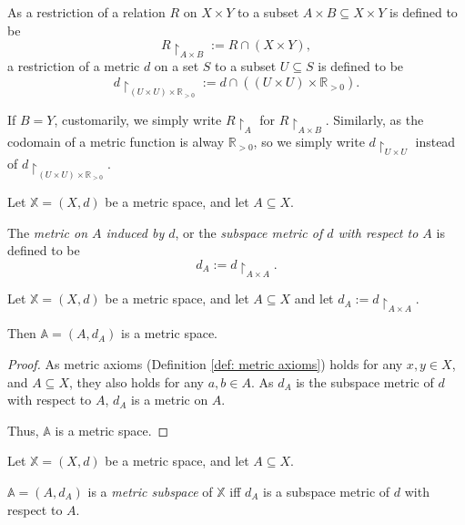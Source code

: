 As a restriction of a relation $R$ on $X \times Y$ to a subset $A \times B \subseteq X \times Y$ is defined to be
$$
R \restriction_{A \times B} := R \cap (X \times Y),
$$
a restriction of a metric $d$ on a set $S$ to a subset $U \subseteq S$ is defined to be
$$
d \restriction_{(U \times U) \times \mathbb R_{> 0}} := d \cap ((U \times U) \times \mathbb R_{> 0}).
$$

If $B = Y$, customarily, we simply write $R \restriction_{A}$ for $R \restriction_{A \times B}$. Similarly, as the codomain of a metric function is alway $\mathbb R_{> 0}$, so we simply write $d \restriction_{U \times U}$ instead of $d \restriction_{(U \times U) \times \mathbb R_{> 0}}$.


\begin{definition}
	\label{def: subspace metric}
	Let $\mathbb X = (X, d)$ be a metric space, and let $A \subseteq X$.
	
	The \textit{metric on $A$ induced by $d$}, or the \textit{subspace metric of $d$ with respect to $A$} is defined to be
	$$
	d_A := d\restriction_{A \times A}.
	$$
\end{definition}


\begin{theorem}
	Let $\mathbb X = (X, d)$ be a metric space, and let $A \subseteq X$ and let $d_A := d\restriction_{A \times A}$.
	
	Then $\mathbb A = (A, d_A)$ is a metric space.
	
	\begin{proof}		
		As metric axioms (Definition \ref{def: metric axioms}) holds for any $x,y \in X$, and $A \subseteq X$, they also holds for any $a, b \in A$. As $d_A$ is the subspace metric of $d$ with respect to $A$, $d_A$ is a metric on $A$.
		
		Thus, $\mathbb A$ is a metric space.
	\end{proof}
\end{theorem}


\begin{definition}
	\label{def: metric subspace}
	Let $\mathbb X = (X, d)$ be a metric space, and let $A \subseteq X$. 
	
	$\mathbb A = (A, d_A)$ is a \textit{metric subspace} of $\mathbb X$ iff $d_A$ is a subspace metric of $d$ with respect to $A$.
\end{definition}



